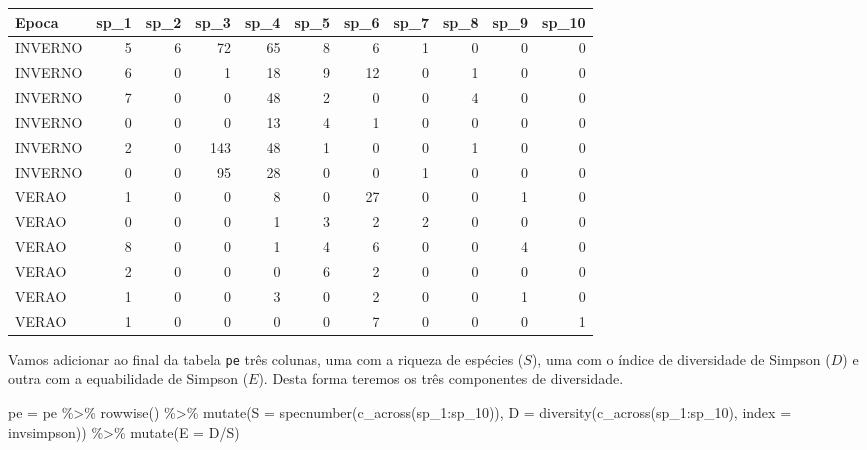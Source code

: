 \documentclass[
]{book}
\newenvironment{Shaded}{\begin{snugshade}}{\end{snugshade}}
\newcommand{\AttributeTok}[1]{\textcolor[rgb]{0.77,0.63,0.00}{#1}}
\newcommand{\FunctionTok}[1]{\textcolor[rgb]{0.00,0.00,0.00}{#1}}
\newcommand{\NormalTok}[1]{#1}
\newcommand{\OtherTok}[1]{\textcolor[rgb]{0.56,0.35,0.01}{#1}}
\newcommand{\SpecialCharTok}[1]{\textcolor[rgb]{0.00,0.00,0.00}{#1}}
\newcommand{\StringTok}[1]{\textcolor[rgb]{0.31,0.60,0.02}{#1}}
\begin{document}
\begin{tabular}{l|r|r|r|r|r|r|r|r|r|r}
\hline
Epoca & sp\_1 & sp\_2 & sp\_3 & sp\_4 & sp\_5 & sp\_6 & sp\_7 & sp\_8 & sp\_9 & sp\_10\\
\hline
INVERNO & 5 & 6 & 72 & 65 & 8 & 6 & 1 & 0 & 0 & 0\\
\hline
INVERNO & 6 & 0 & 1 & 18 & 9 & 12 & 0 & 1 & 0 & 0\\
\hline
INVERNO & 7 & 0 & 0 & 48 & 2 & 0 & 0 & 4 & 0 & 0\\
\hline
INVERNO & 0 & 0 & 0 & 13 & 4 & 1 & 0 & 0 & 0 & 0\\
\hline
INVERNO & 2 & 0 & 143 & 48 & 1 & 0 & 0 & 1 & 0 & 0\\
\hline
INVERNO & 0 & 0 & 95 & 28 & 0 & 0 & 1 & 0 & 0 & 0\\
\hline
VERAO & 1 & 0 & 0 & 8 & 0 & 27 & 0 & 0 & 1 & 0\\
\hline
VERAO & 0 & 0 & 0 & 1 & 3 & 2 & 2 & 0 & 0 & 0\\
\hline
VERAO & 8 & 0 & 0 & 1 & 4 & 6 & 0 & 0 & 4 & 0\\
\hline
VERAO & 2 & 0 & 0 & 0 & 6 & 2 & 0 & 0 & 0 & 0\\
\hline
VERAO & 1 & 0 & 0 & 3 & 0 & 2 & 0 & 0 & 1 & 0\\
\hline
VERAO & 1 & 0 & 0 & 0 & 0 & 7 & 0 & 0 & 0 & 1\\
\hline
\end{tabular}

Vamos adicionar ao final da tabela \texttt{pe} três colunas, uma com a riqueza de espécies (\(S\)), uma com o índice de diversidade de Simpson (\(D\)) e outra com a equabilidade de Simpson (\(E\)). Desta forma teremos os três componentes de diversidade.

\begin{Shaded}
\begin{Highlighting}[]
\NormalTok{pe }\OtherTok{=}\NormalTok{ pe }\SpecialCharTok{\%\textgreater{}\%}
  \FunctionTok{rowwise}\NormalTok{() }\SpecialCharTok{\%\textgreater{}\%} 
  \FunctionTok{mutate}\NormalTok{(}\AttributeTok{S =} \FunctionTok{specnumber}\NormalTok{(}\FunctionTok{c\_across}\NormalTok{(sp\_1}\SpecialCharTok{:}\NormalTok{sp\_10)),}
         \AttributeTok{D =} \FunctionTok{diversity}\NormalTok{(}\FunctionTok{c\_across}\NormalTok{(sp\_1}\SpecialCharTok{:}\NormalTok{sp\_10), }
                       \AttributeTok{index =} \StringTok{\textquotesingle{}invsimpson\textquotesingle{}}\NormalTok{)) }\SpecialCharTok{\%\textgreater{}\%} 
  \FunctionTok{mutate}\NormalTok{(}\AttributeTok{E =}\NormalTok{ D}\SpecialCharTok{/}\NormalTok{S)}
\end{Highlighting}
\end{Shaded}
\end{document}

